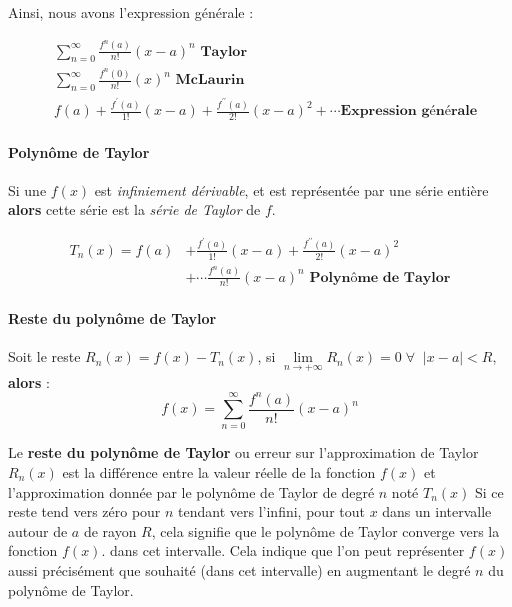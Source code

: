 \documentclass{report}
\begin{document}
\begin{multicols*}{3}
  Ainsi, nous avons l'expression générale : 
  
  \begin{align*}
      &\sum_{n=0}^{\infty } \frac{f^{n}(a)}{n!}(x - a)^n 
       \textbf{ Taylor}   
      \\ 
      &\sum_{n=0}^{\infty } \frac{f^{n}(0)}{n!}(x)^n 
       \textbf{ McLaurin}   
      \\
      &f(a) + \frac{f^{\prime}(a)}{1!}(x - a) + 
             \frac{f^{\prime\prime}(a)}{2!}(x - a)^2 + 
             \cdots \textbf{Expression générale}  
  \end{align*}    

  \paragraph{Polynôme de Taylor}
  Si une $f(x)$ est \textit{infiniement dérivable}, 
  et est représentée par une série entière 
  \textbf{alors} cette série est la 
  \textit{série de Taylor} de $f$.   
  \vspace{-1em}

  \begin{align*}
    T_n(x) = f(a) &+ \frac{f^{\prime}(a)}{1!}(x - a) + 
             \frac{f^{\prime\prime}(a)}{2!}(x - a)^2  
             \\
       &+      \cdots
      \frac{f^{n}(a)}{n!}(x - a)^n 
      \textbf{ Polynôme de Taylor}             
  \end{align*}

  \paragraph{Reste du polynôme de Taylor}
  Soit le reste $R_n(x) =  f(x) - T_n(x)$, si 
  $\lim\limits_{n \to+\infty }R_n(x) = 0 
  \;\forall \;\; |x - a| < R $, \textbf{alors}  :
  \[ 
        f(x) = \sum_{n=0}^{\infty } 
        \frac{f^{n}(a)}{n!}(x - a)^n   
    \]

    Le \textbf{reste du polynôme de Taylor} ou 
    erreur sur l'approximation de Taylor 
    $R_n(x)$ est la différence entre la valeur 
    réelle de la fonction $f(x)$ 
    et l'approximation donnée par le polynôme de 
    Taylor de degré $n$ noté $T_n(x)$
    Si ce reste tend vers zéro pour $n$ tendant 
    vers l'infini, pour tout $x$ dans un 
    intervalle autour de $a$ de rayon $R$, 
    cela signifie que le polynôme de Taylor 
    converge vers la fonction $f(x)$. dans cet 
    intervalle. Cela indique que l'on peut 
    représenter $f(x)$ aussi précisément que 
    souhaité (dans cet intervalle) en augmentant 
    le degré $n$ du polynôme de Taylor.



\end{multicols*}
\end{document}
